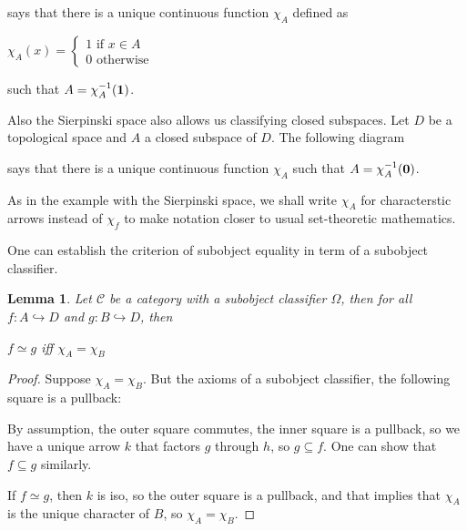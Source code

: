 \documentclass[a4paper]{article}
\theoremstyle{defin}
\theoremstyle{theorem}
\theoremstyle{claim}
\theoremstyle{prop}
\theoremstyle{lemma}
\newtheorem{lemma}{Lemma}
\theoremstyle{fact}
\theoremstyle{ex}
\theoremstyle{col}
\begin{document}

says that there is a unique continuous function $\chi_A$ defined as
\begin{center}
$\chi_A(x) = \begin{cases} 1 \text{  if $x \in A$} \\ 0 \text{  otherwise} \end{cases} $
\end{center}
such that $A = \chi_A^{-1}({\bf 1})$.

Also the Sierpinski space also allows us classifying closed subspaces. Let $D$ be a topological space and $A$ a closed subspace of $D$. The following diagram

says that there is a unique continuous function $\chi_A$ such that $A = \chi_A^{-1}({\bf 0})$.

As in the example with the Sierpinski space, we shall write $\chi_A$ for characterstic arrows instead of $\chi_f$ to make notation closer to usual set-theoretic mathematics.

One can establish the criterion of subobject equality in term of a subobject classifier.

\begin{lemma}

Let $\mathcal{C}$ be a category with a subobject classifier $\Omega$, then for all $f : A \hookrightarrow D$ and $g : B \hookrightarrow D$, then

\begin{center}
$f \simeq g$ iff $\chi_A = \chi_B$
\end{center}

\end{lemma}

\begin{proof}
Suppose $\chi_A = \chi_B$. But the axioms of a subobject classifier, the following square is a pullback:

\centerline{
}

By assumption, the outer square commutes, the inner square is a pullback, so we have a unique arrow $k$ that factors $g$ through $h$, so $g \subseteq f$. One can show that $f \subseteq g$ similarly.

If $f \simeq g$, then $k$ is iso, so the outer square is a pullback, and that implies that $\chi_A$ is the unique character of $B$, so $\chi_A = \chi_B$.
\end{proof}
\end{document}

